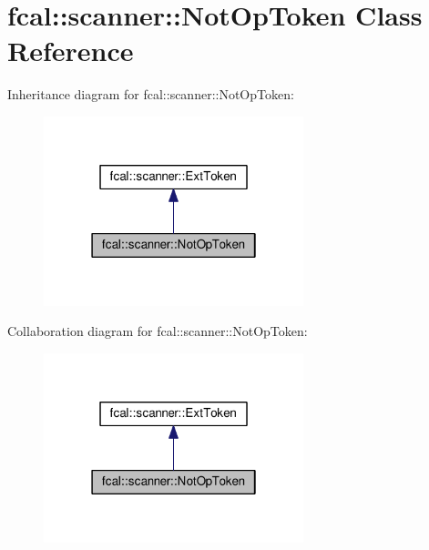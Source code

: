 \hypertarget{classfcal_1_1scanner_1_1NotOpToken}{}\section{fcal\+:\+:scanner\+:\+:Not\+Op\+Token Class Reference}
\label{classfcal_1_1scanner_1_1NotOpToken}


Inheritance diagram for fcal\+:\+:scanner\+:\+:Not\+Op\+Token\+:
\nopagebreak
\begin{figure}[H]
\begin{center}
\leavevmode
\includegraphics[width=214pt]{classfcal_1_1scanner_1_1NotOpToken__inherit__graph}
\end{center}
\end{figure}


Collaboration diagram for fcal\+:\+:scanner\+:\+:Not\+Op\+Token\+:
\nopagebreak
\begin{figure}[H]
\begin{center}
\leavevmode
\includegraphics[width=214pt]{classfcal_1_1scanner_1_1NotOpToken__coll__graph}
\end{center}
\end{figure}
